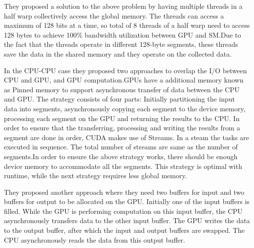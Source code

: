 They proposed a solution to the above problem by having multiple threads in a half warp collectively access the global memory. The threads can access a maximum of 128 bits at a time, so total of 8 threads of a half warp need to access 128 bytes to achieve 100\% bandwidth utilization between GPU and SM.Due to the fact that the threads operate in different 128-byte segments, these threads save the data in the shared memory and they operate on the collected data.

In the CPU-CPU case they proposed two approaches to overlap the I/O between CPU and GPU, and GPU computation.GPUs have a additional memory known as Pinned memory to support asynchronous transfer of data between the CPU and GPU. The strategy consists of four parts: Initially partitioning the input data into segments, asynchronously copying each segment to the device memory, processing each segment on the GPU and returning the results to the CPU. In order to ensure that the transferring, processing and writing the results from a segment are done in order, CUDA makes use of Streams. In a steam the tasks are executed in sequence. The total number of streams are same as the number of segments.In order to ensure the above strategy works, there should be enough device memory to accommodate all the segments. This strategy is optimal with runtime, while the next strategy requires less global memory.

They proposed another approach where they need two buffers for input and two buffers for output to be allocated on the GPU. Initially one of the input buffers is filled. While the GPU is performing computation on this input buffer, the CPU asynchronously transfers data to the other input buffer. The GPU writes the data to the output buffer, after which the input and output buffers are swapped. The CPU asynchronously reads the data from this output buffer. 